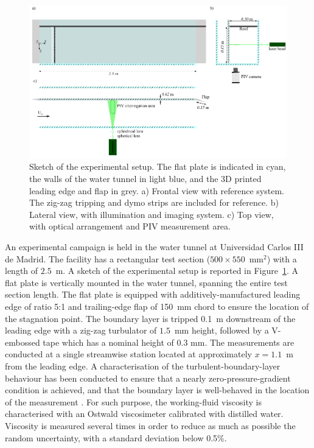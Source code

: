 \begin{figure}
\includegraphics[width = 0.99\linewidth]{Figures/setup.pdf}
\caption{Sketch of the experimental setup. The flat plate is indicated in cyan, the walls of the water tunnel in light blue, and the 3D printed leading edge and flap in grey. a) Frontal view with reference system. The zig-zag tripping and dymo strips are included for reference. b) Lateral view, with illumination and imaging system. c) Top view, with optical arrangement and PIV measurement area.
}\label{fig:expsetup}
\end{figure}



An experimental campaign is held in the water tunnel at Universidad Carlos III de Madrid. The facility has a rectangular test section ($500 \times 550$~mm$^2$) with a length of $2.5$~m. A sketch of the experimental setup is reported in Figure~\ref{fig:expsetup}.  A flat plate is vertically mounted in the water tunnel, spanning the entire test section length. The flat plate is equipped with additively-manufactured leading edge of ratio 5:1 and trailing-edge flap of 150~mm chord to ensure the location of the stagnation point. The boundary layer is tripped 0.1~m downstream of the leading edge with a zig-zag turbulator of $1.5$~mm height, followed by a V-embossed tape which has a nominal height of 0.3 mm. The measurements are conducted at a single streamwise station located at approximately $x=1.1$~m from the leading edge. A characterisation of the turbulent-boundary-layer behaviour has been conducted to ensure that a nearly zero-pressure-gradient condition is achieved, and that the boundary layer is well-behaved in the location of the measurement \citep{Sanmiguel:2017JFM}. For such purpose, the working-fluid viscosity is characterised with an Ostwald viscosimeter calibrated with distilled water. Viscosity is measured several times in order to reduce as much as possible the random uncertainty, with a standard deviation below 0.5\%.

